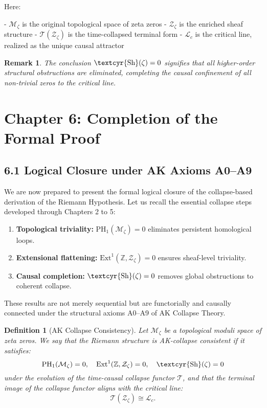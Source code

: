\documentclass[11pt]{article}
\newtheorem{definition}[theorem]{Definition}
\newtheorem{remark}[theorem]{Remark}
\newcommand{\Sha}{\text{\textcyr{Sh}}}
\begin{document}
Here:

- $\mathcal{M}_\zeta$ is the original topological space of zeta zeros
- $\mathcal{Z}_\zeta$ is the enriched sheaf structure
- $\mathcal{T}(\mathcal{Z}_\zeta)$ is the time-collapsed terminal form
- $\mathcal{L}_c$ is the critical line, realized as the unique causal attractor

\begin{remark}
The conclusion $\Sha(\zeta) = 0$ signifies that all higher-order structural obstructions are eliminated,  
completing the causal confinement of all non-trivial zeros to the critical line.
\end{remark}



\section{Chapter 6: Completion of the Formal Proof}

\subsection{6.1 Logical Closure under AK Axioms A0–A9}

We are now prepared to present the formal logical closure of the collapse-based derivation of the Riemann Hypothesis.  
Let us recall the essential collapse steps developed through Chapters 2 to 5:

\begin{enumerate}
    \item \textbf{Topological triviality:} $\mathrm{PH}_1(\mathcal{M}_\zeta) = 0$ eliminates persistent homological loops.
    \item \textbf{Extensional flattening:} $\mathrm{Ext}^1(\mathbb{Z}, \mathcal{Z}_\zeta) = 0$ ensures sheaf-level triviality.
    \item \textbf{Causal completion:} $\Sha(\zeta) = 0$ removes global obstructions to coherent collapse.
\end{enumerate}

These results are not merely sequential but are functorially and causally connected under the structural axioms A0–A9 of AK Collapse Theory.

\begin{definition}[AK Collapse Consistency]
Let $\mathcal{M}_\zeta$ be a topological moduli space of zeta zeros.  
We say that the Riemann structure is AK-collapse consistent if it satisfies:
\[
\mathrm{PH}_1(\mathcal{M}_\zeta) = 0,\quad \mathrm{Ext}^1(\mathbb{Z}, \mathcal{Z}_\zeta) = 0,\quad \Sha(\zeta) = 0
\]
under the evolution of the time-causal collapse functor $\mathcal{T}$, and that the terminal image of the collapse functor aligns with the critical line:
\[
\mathcal{T}(\mathcal{Z}_\zeta) \cong \mathcal{L}_c.
\]
\end{definition}
\end{document}
